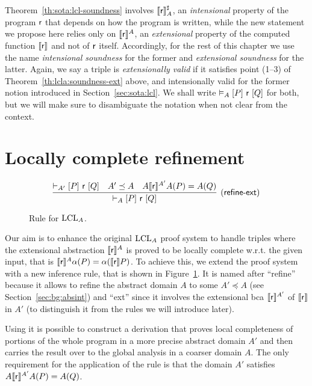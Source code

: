Theorem~\ref{th:sota:lcl-soundness} involves $\llbracket\mathsf{r}\rrbracket^{\sharp}_A$, an \emph{intensional} property of the program $\mathsf{r}$ that depends on how the program is written, while the new statement we propose here relies only on $\llbracket\mathsf{r}\rrbracket^A$, an \emph{extensional} property of the computed function $\llbracket\mathsf{r}\rrbracket$ and not of $\mathsf{r}$ itself.
Accordingly, for the rest of this chapter we use the name \emph{intensional soundness} for the former and \emph{extensional soundness} for the latter.
Again, we say a triple is \emph{extensionally valid} if it satisfies point (1--3) of Theorem~\ref{th:lcla:soundness-ext} above, and intensionally valid for the former notion introduced in Section~\ref{sec:sota:lcl}. We shall write $\vDash_{A}\nobreak[P]~\mathsf{r}~[Q]$ for both, but we will make sure to disambiguate the notation when not clear from the context.

\section{Locally complete refinement}
\begin{figure*}[t]
	\begin{framed}
		\[
		\infer[\lclrule{refine\mbox{-}ext}]
		{\lcl{A}{P}{\regr}{Q}}
		{\lcl{A'}{P}{\regr}{Q} & A' \preceq A & A \denot{\regr}^{A'} A(P) = A(Q)}
		\]
	\end{framed}
	\vspace{-1ex}
	\caption{Rule  for $\text{LCL}_A$.}\label{fig:lcla:rule-refine}
\end{figure*}

Our aim is to enhance the original $\text{LCL}_A$ proof system to handle triples where the extensional abstraction $\llbracket\mathsf{r}\rrbracket^{A}$ is proved to be locally complete w.r.t. the given input, that is $\llbracket\mathsf{r}\rrbracket^{A} \alpha(P) = \alpha(\llbracket\mathsf{r}\rrbracket P)$. To achieve this, we extend the proof system with a new inference rule, that is shown in Figure~\ref{fig:lcla:rule-refine}. It is named after ``refine'' because it allows to refine the abstract domain $A$ to some $A' \preceq A$ (see Section~\ref{sec:bg:absint}) and ``ext'' since it involves the extensional bca $\llbracket\mathsf{r}\rrbracket^{A'}$ of $\llbracket\mathsf{r}\rrbracket$ in $A'$ (to distinguish it from the rules we will introduce later).

Using  it is possible to construct a derivation that proves local completeness of portions of the whole program in a more precise abstract domain $A'$ and then carries the result over to the global analysis in a coarser domain $A$. The only requirement for the application of the rule is that the domain $A'$ satisfies $A \llbracket\mathsf{r}\rrbracket^{A'} A(P) = A(Q)$.

